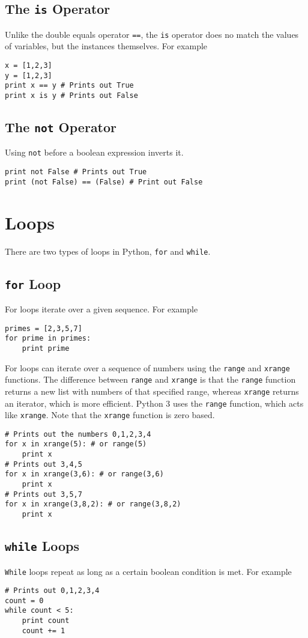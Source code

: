 \documentclass[a4paper,oneside]{book}
\numberwithin{equation}{chapter}
\begin{document}
\subsection{The \texttt{is} Operator}
Unlike the double equals operator \verb|==|, the \texttt{is} operator does no match the values of variables, but the instances themselves. For example
\begin{verbatim}
x = [1,2,3]
y = [1,2,3]
print x == y # Prints out True
print x is y # Prints out False
\end{verbatim}
\subsection{The \texttt{not} Operator}
Using \texttt{not} before a boolean expression inverts it.
\begin{verbatim}
print not False # Prints out True
print (not False) == (False) # Print out False
\end{verbatim}
\section{Loops}
There are two types of loops in Python, \texttt{for} and \texttt{while}.
\subsection{\texttt{for} Loop}
For loops iterate over a given sequence. For example
\begin{verbatim}
primes = [2,3,5,7]
for prime in primes:
    print prime
\end{verbatim}

For loops can iterate over a sequence of numbers using the \texttt{range} and \texttt{xrange} functions. The difference between \texttt{range} and \texttt{xrange} is that the \texttt{range} function returns a new list with numbers of that specified range, whereas \texttt{xrange} returns an iterator, which is more efficient. Python 3 uses the \texttt{range} function, which acts like \texttt{xrange}. Note that the \texttt{xrange} function is zero based.
\begin{verbatim}
# Prints out the numbers 0,1,2,3,4
for x in xrange(5): # or range(5)
    print x
# Prints out 3,4,5
for x in xrange(3,6): # or range(3,6)
    print x
# Prints out 3,5,7
for x in xrange(3,8,2): # or range(3,8,2)
    print x
\end{verbatim}
\subsection{\texttt{while} Loops}
\texttt{While} loops repeat as long as a certain boolean condition is met. For example
\begin{verbatim}
# Prints out 0,1,2,3,4
count = 0
while count < 5:
    print count
    count += 1 
\end{verbatim}
\end{document}
